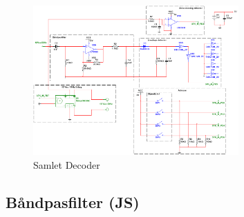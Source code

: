 \begin{figure}[htbp]
	\centering
	\includegraphics[width=0.70\textwidth]{billeder/HWdesign/Decoder}
	\caption{Samlet Decoder}
	\label{fig:Decoder}
\end{figure}


\newpage

\subsection{Båndpasfilter (JS)}
\label{Båndpasfilter}

